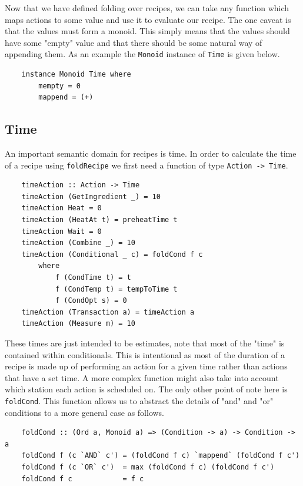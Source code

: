 \documentclass[11pt]{article}
\begin{document}
Now that we have defined folding over recipes, we can take any function which maps actions
to some value and use it to evaluate our recipe. The one caveat is that the values must form
a monoid. This simply means that the values should have some "empty" value and that there should
be some natural way of appending them. As an example the \texttt{Monoid} instance of
\texttt{Time} is given below.

\begin{lstlisting}
    instance Monoid Time where
        mempty = 0
        mappend = (+)
\end{lstlisting}

\subsection{Time}

An important semantic domain for recipes is time. In order to calculate the
time of a recipe using \texttt{foldRecipe} we first need a function of type \texttt{Action -> Time}.

\begin{lstlisting}
    timeAction :: Action -> Time
    timeAction (GetIngredient _) = 10
    timeAction Heat = 0
    timeAction (HeatAt t) = preheatTime t
    timeAction Wait = 0
    timeAction (Combine _) = 10
    timeAction (Conditional _ c) = foldCond f c
        where
            f (CondTime t) = t
            f (CondTemp t) = tempToTime t
            f (CondOpt s) = 0
    timeAction (Transaction a) = timeAction a
    timeAction (Measure m) = 10
\end{lstlisting}

These times are just intended to be estimates, note that most of the "time" is contained within
conditionals. This is intentional as most of the duration of a recipe is made up of performing an
action for a given time rather than actions that have a set time. A more complex function might
also take into account which station each action is scheduled on. The only other point of note
here is \texttt{foldCond}. This function allows us to abstract the details of "and" and "or"
conditions to a more general case as follows.

\begin{lstlisting}
    foldCond :: (Ord a, Monoid a) => (Condition -> a) -> Condition -> a
    foldCond f (c `AND` c') = (foldCond f c) `mappend` (foldCond f c')
    foldCond f (c `OR` c')  = max (foldCond f c) (foldCond f c')
    foldCond f c            = f c
\end{lstlisting}
\end{document}
